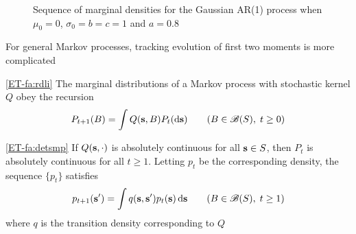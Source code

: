 \begin{frame}

    \begin{figure}
        \centering
        \caption{\label{f:norm_den_seq} Sequence of marginal densities for the Gaussian AR(1)
        process when $\mu_0=0$, $\sigma_0 = b = c =1$ and $a = 0.8$}
    \end{figure}
    \end{frame}

\begin{frame}

    \vspace{2em}
    For general Markov processes, tracking evolution of first two moments is more complicated
    
    \vspace{1em}
    \Fact\textcolor{Brown}{\eqref{ET-fa:rdli}}
        The marginal distributions of a Markov process with stochastic kernel $Q$
        obey the recursion
        \begin{equation}
            \label{eq:rdli}
            P_{t+1}(B) = \int Q({\mathbf s}, B) P_t(\mathop{}\!\mathrm{d}  {\mathbf s})
            \qquad (B \in \mathscr B(S),\; t \geq 0)
        \end{equation}
    
\end{frame}

\begin{frame}

    \vspace{2em}
    \Fact\eqref{ET-fa:detsmp}
        If $Q({\mathbf s}, \cdot)$ is absolutely continuous for all ${\mathbf s} \in S$,
        then $P_t$ is absolutely continuous for all $t \geq 1$.  Letting $p_t$
        be the corresponding density, the sequence $\{p_t\}$ satisfies 
        \begin{equation}
            \label{eq:rdli2}
            p_{t+1}({\mathbf s}') = \int q( {\mathbf s}, {\mathbf s}') p_t({\mathbf s}) \mathop{}\!\mathrm{d} {\mathbf s}
            \qquad (B \in \mathscr B(S),\; t \geq 1)
        \end{equation}
        where $q$ is the transition density corresponding to $Q$

\end{frame}


